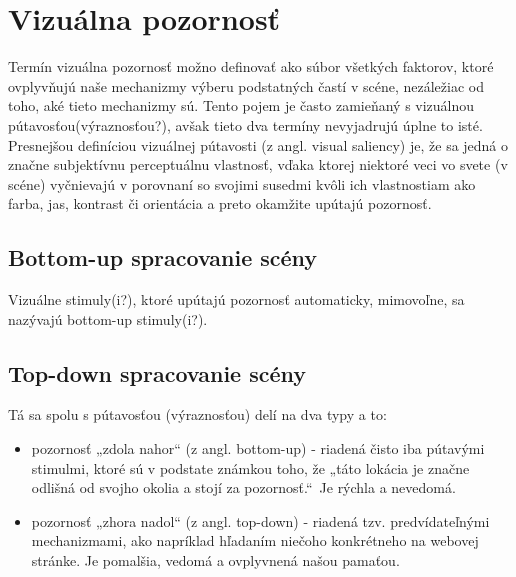 \newpage

\section{Vizuálna pozornosť}
\label{saliency}
	
Termín vizuálna pozornosť možno definovať ako súbor %
všetkých faktorov, ktoré ovplyvňujú naše mechanizmy výberu podstatných častí v scéne, nezáležiac od toho, aké tieto mechanizmy sú. %
Tento pojem je často zamieňaný s vizuálnou pútavosťou(výraznosťou?), avšak tieto dva termíny nevyjadrujú úplne to isté. Presnejšou definíciou vizuálnej pútavosti (z angl. visual saliency) je, že sa jedná o značne subjektívnu perceptuálnu vlastnosť, vďaka ktorej niektoré veci vo svete (v scéne) vyčnievajú v porovnaní so svojimi susedmi kvôli ich vlastnostiam ako farba, jas, kontrast či orientácia a preto okamžite upútajú pozornosť.\cite{itti2007visual} 

\subsection{Bottom-up spracovanie scény}
Vizuálne stimuly(i?), ktoré upútajú pozornosť automaticky, mimovoľne, sa nazývajú bottom-up stimuly(i?). 


\subsection{Top-down spracovanie scény}



	Tá sa spolu s pútavosťou (výraznosťou) delí na dva typy a to:
	\begin{itemize}
		\item pozornosť „zdola nahor“ (z angl. bottom-up) - riadená čisto iba pútavými stimulmi, ktoré sú v podstate známkou toho, že „táto lokácia je značne odlišná od svojho okolia a stojí za pozornosť.“\ Je rýchla a nevedomá.
		\item pozornosť „zhora nadol“ (z angl. top-down) - riadená tzv. predvídateľnými mechanizmami, ako napríklad hľadaním niečoho konkrétneho na webovej stránke. Je pomalšia, vedomá a ovplyvnená našou pamaťou. 
		
	\end{itemize}
	

